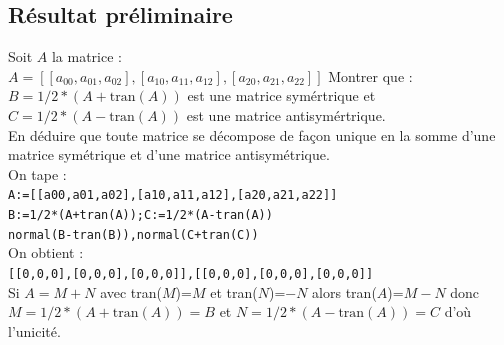 \documentclass[a4paper,11pt]{book}
\begin{document}
\subsection{R\'esultat pr\'eliminaire}
Soit $A$ la matrice :\\
$A=[[a_{00},a_{01},a_{02}],[a_{10},a_{11},a_{12}],[a_{20},a_{21},a_{22}]]$
Montrer que :\\
$B=1/2*(A+\mbox{tran}(A))$ est une matrice sym\'ertrique et\\
 $C=1/2*(A-\mbox{tran}(A))$ est une matrice antisym\'ertrique.\\
En d\'eduire que toute matrice se d\'ecompose de fa\c{c}on unique en la somme 
d'une matrice sym\'etrique et d'une matrice antisym\'etrique.\\
On tape :\\
{\tt A:=[[a00,a01,a02],[a10,a11,a12],[a20,a21,a22]]}\\
{\tt B:=1/2*(A+tran(A));C:=1/2*(A-tran(A))}\\
{\tt normal(B-tran(B)),normal(C+tran(C))}\\
On obtient :\\
{\tt [[0,0,0],[0,0,0],[0,0,0]],[[0,0,0],[0,0,0],[0,0,0]]}\\
Si $A=M+N$ avec tran($M$)=$M$ et tran($N$)=$-N$ alors tran($A$)=$M-N$ donc \\
$M=1/2*(A+\mbox{tran}(A))=B$ et $N=1/2*(A-\mbox{tran}(A))=C$ d'o\`u l'unicit\'e.
\end{document}
